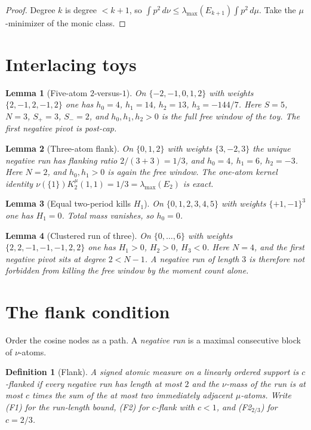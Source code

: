 \documentclass[11pt]{article}
\newtheorem{lemma}{Lemma}
\newtheorem{definition}{Definition}
\theoremstyle{remark}
\begin{document}
\begin{proof}
Degree $k$ is degree $<k+1$, so
$\int p^2\,d\nu\le\lambda_{\max}(E_{k+1})\int p^2\,d\mu$.
Take the $\mu$-minimizer of the monic class.
\end{proof}

\section{Interlacing toys}\label{sec:toy}

\begin{lemma}[Five-atom $2$-versus-$1$]\label{lem:toy-int}
On $\{-2,-1,0,1,2\}$ with weights $\{2,-1,2,-1,2\}$ one has
$h_0=4$, $h_1=14$, $h_2=13$, $h_3=-144/7$.  Here $S=5$, $N=3$,
$S_+=3$, $S_-=2$, and $h_0,h_1,h_2>0$ is the full free window of
the toy.  The first negative pivot is post-cap.
\end{lemma}

\begin{lemma}[Three-atom flank]\label{lem:toy-flank}
On $\{0,1,2\}$ with weights $\{3,-2,3\}$ the unique negative
run has flanking ratio $2/(3+3)=1/3$, and
$h_0=4$, $h_1=6$, $h_2=-3$.  Here $N=2$, and $h_0,h_1>0$ is
again the free window.  The one-atom kernel identity
$\nu(\{1\})K_2^\mu(1,1)=1/3=\lambda_{\max}(E_2)$ is exact.
\end{lemma}

\begin{lemma}[Equal two-period kills $H_1$]\label{lem:adv-tp}
On $\{0,1,2,3,4,5\}$ with weights $\{+1,-1\}^3$ one has
$H_1=0$.  Total mass vanishes, so $h_0=0$.
\end{lemma}

\begin{lemma}[Clustered run of three]\label{lem:toy-cluster}
On $\{0,\ldots,6\}$ with weights
$\{2,2,-1,-1,-1,2,2\}$ one has $H_1>0$, $H_2>0$, $H_3<0$.
Here $N=4$, and the first negative pivot sits at degree $2<N-1$.
A negative run of length $3$ is therefore not forbidden from
killing the free window by the moment count alone.
\end{lemma}

\section{The flank condition}\label{sec:flank}

Order the cosine nodes as a path.  A \emph{negative run} is a
maximal consecutive block of $\nu$-atoms.

\begin{definition}[Flank]\label{def:flank}
A signed atomic measure on a linearly ordered support is
\emph{$c$-flanked} if every negative run has length at most $2$
and the $\nu$-mass of the run is at most $c$ times the sum of
the at most two immediately adjacent $\mu$-atoms.
Write (F1) for the run-length bound, (F2) for $c$-flank with
$c<1$, and (F2$_{2/3}$) for $c=2/3$.
\end{definition}
\end{document}
